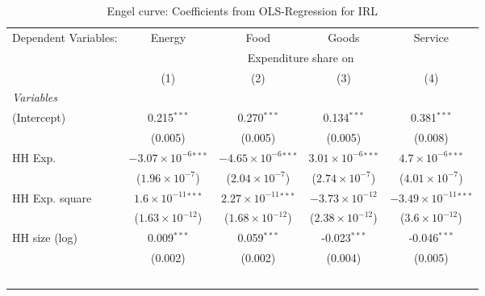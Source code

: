 
\begin{table}[htbp!]
   \centering
   \small
   \begin{adjustbox}{width = 1\textwidth, max height = 0.95\textheight, center}
      \begin{threeparttable}[b]
         \caption{\label{tab:Engel_parametric_IRL} Engel curve: Coefficients from OLS-Regression for IRL}
         \begin{tabular}{lcccc}
            \tabularnewline \midrule \midrule
            Dependent Variables: & Energy                         & Food                           & Goods                         & Service\\  
             & \multicolumn{4}{c}{Expenditure share on} \\ 
                                 & (1)                            & (2)                            & (3)                           & (4)\\  
            \midrule
            \emph{Variables}\\
            (Intercept)          & 0.215$^{***}$                  & 0.270$^{***}$                  & 0.134$^{***}$                 & 0.381$^{***}$\\   
                                 & (0.005)                        & (0.005)                        & (0.005)                       & (0.008)\\   
            HH Exp.              & $-3.07\times 10^{-6}$$^{***}$  & $-4.65\times 10^{-6}$$^{***}$  & $3.01\times 10^{-6}$$^{***}$  & $4.7\times 10^{-6}$$^{***}$\\    
                                 & ($1.96\times 10^{-7}$)         & ($2.04\times 10^{-7}$)         & ($2.74\times 10^{-7}$)        & ($4.01\times 10^{-7}$)\\    
            HH Exp. square       & $1.6\times 10^{-11}$$^{***}$   & $2.27\times 10^{-11}$$^{***}$  & $-3.73\times 10^{-12}$        & $-3.49\times 10^{-11}$$^{***}$\\    
                                 & ($1.63\times 10^{-12}$)        & ($1.68\times 10^{-12}$)        & ($2.38\times 10^{-12}$)       & ($3.6\times 10^{-12}$)\\    
            HH size (log)        & 0.009$^{***}$                  & 0.059$^{***}$                  & -0.023$^{***}$                & -0.046$^{***}$\\   
                                 & (0.002)                        & (0.002)                        & (0.004)                       & (0.005)\\   
$$
\end{tabular}
\end{threeparttable}
\end{adjustbox}
\end{table}
